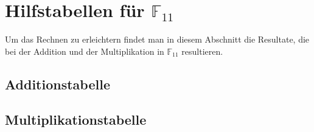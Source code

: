 %
%
%
\section{Hilfstabellen für $\mathbb{F}_{11}$
	\label{reedsolomon:section:hilfstabellen}}

Um das Rechnen  zu erleichtern findet man in diesem Abschnitt die Resultate, die bei der Addition und der Multiplikation in $\mathbb{F}_{11}$ resultieren.

\subsection{Additionstabelle
	\label{reedsolomon:subsection:adtab}}	


\subsection{Multiplikationstabelle
	\label{reedsolomon:subsection:mptab}}
